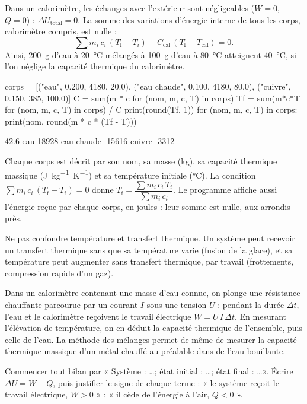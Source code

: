 \begin{savoirfaire}
Dans un calorimètre, les échanges avec l'extérieur sont négligeables ($W=0$, $Q=0$) : $\Delta U_\mathrm{total}=0$. La somme des
variations d'énergie interne de tous les corps, calorimètre compris, est nulle :
\[\sum m_i\,c_i\,(T_\mathrm{f}-T_i)+C_\mathrm{cal}\,(T_\mathrm{f}-T_\mathrm{cal})=0.\]
Ainsi, \qty{200}{g} d'eau à \qty{20}{\degreeCelsius} mélangés à \qty{100}{g} d'eau à \qty{80}{\degreeCelsius} atteignent
\qty{40}{\degreeCelsius}, si l'on néglige la capacité thermique du calorimètre.
\end{savoirfaire}
\begin{codecote}[0.64]
\begin{pythoncol}
corps = [("eau", 0.200, 4180, 20.0),
         ("eau chaude", 0.100, 4180, 80.0),
         ("cuivre", 0.150, 385, 100.0)]
C = sum(m * c for (nom, m, c, T) in corps)
Tf = sum(m*c*T for (nom, m, c, T) in corps) / C
print(round(Tf, 1))
for (nom, m, c, T) in corps:
    print(nom, round(m * c * (Tf - T)))
\end{pythoncol}
\begin{consolecol}
42.6
eau 18928
eau chaude -15616
cuivre -3312
\end{consolecol}
\cote
\fontsize{9.5}{12.5}\selectfont
{}\par\smallskip
Chaque corps est décrit par son nom, sa masse (kg), sa capacité thermique massique (\unit{J.kg^{-1}.K^{-1}}) et sa
température initiale (\unit{\degreeCelsius}). La condition $\sum m_i\,c_i\,(T_\mathrm{f}-T_i)=0$ donne
$T_\mathrm{f}=\dfrac{\sum m_i\,c_i\,T_i}{\sum m_i\,c_i}$. Le programme affiche aussi l'énergie reçue par chaque corps, en
joules : leur somme est nulle, aux arrondis près.
\end{codecote}
\begin{attention}
Ne pas confondre température et transfert thermique. Un système peut recevoir un transfert thermique sans que sa
température varie (fusion de la glace), et sa température peut augmenter sans transfert thermique, par travail
(frottements, compression rapide d'un gaz).
\end{attention}
\begin{experience}
Dans un calorimètre contenant une masse d'eau connue, on plonge une résistance chauffante parcourue par un courant
$I$ sous une tension $U$ : pendant la durée $\Delta t$, l'eau et le calorimètre reçoivent le travail électrique
$W=U\,I\,\Delta t$. En mesurant l'élévation de température, on en déduit la capacité thermique de l'ensemble, puis celle de
l'eau. La méthode des mélanges permet de même de mesurer la capacité thermique massique d'un métal chauffé au
préalable dans de l'eau bouillante.
\end{experience}
\begin{rediger}
Commencer tout bilan par « Système : \dots ; état initial : \dots ; état final : \dots ». Écrire $\Delta U=W+Q$, puis
justifier le signe de chaque terme : « le système reçoit le travail électrique, $W>0$ » ; « il cède de l'énergie à l'air,
$Q<0$ ».
\end{rediger}
\exercices

